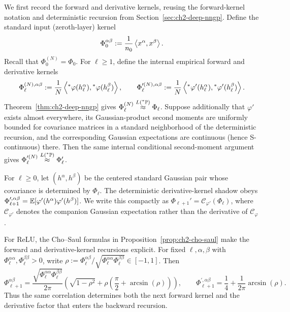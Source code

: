 We first record the forward and derivative kernels, reusing the forward-kernel notation and deterministic recursion from Section~\ref{sec:ch2-deep-nngp}. Define the standard input (zeroth-layer) kernel
\begin{equation}\label{eq:ch2-deep-ntk-phi0}
\Phi_0^{\alpha\beta} := \frac{1}{n_0} \left\langle x^\alpha, x^\beta \right\rangle.
\end{equation}
Recall that $\Phi_0^{(N)} = \Phi_0$. For $\ell \ge 1$, define the internal empirical forward and derivative kernels
\begin{equation}\label{eq:ch2-deep-ntk-emp-kernels}
\Phi_\ell^{(N),\alpha\beta} := \frac{1}{N} \left\langle {}^*\varphi(h_\ell^\alpha), {}^*\varphi(h_\ell^\beta) \right\rangle, \qquad
\Phi_\ell^{\prime(N),\alpha\beta} := \frac{1}{N} \left\langle {}^*\varphi'(h_\ell^\alpha), {}^*\varphi'(h_\ell^\beta) \right\rangle.
\end{equation}
Theorem~\ref{thm:ch2-deep-nngp} gives $\Phi_\ell^{(N)} \stackrel{L({}^*\mathbb{P})}{\approx} \Phi_\ell$. Suppose additionally that $\varphi'$ exists almost everywhere, its Gaussian-product second moments are uniformly bounded for covariance matrices in a standard neighborhood of the deterministic recursion, and the corresponding Gaussian expectations are continuous (hence S-continuous) there. Then the same internal conditional second-moment argument gives $\Phi_\ell^{\prime(N)} \stackrel{L({}^*\mathbb{P})}{\approx} \Phi_\ell'$.

For $\ell \ge 0$, let $(h^\alpha, h^\beta)$ be the centered standard Gaussian pair whose covariance is determined by $\Phi_\ell$. The deterministic derivative-kernel shadow obeys $\Phi_{\ell+1}^{\prime,\alpha\beta} = \mathbb{E}[\varphi'(h^\alpha)\varphi'(h^\beta)]$. We write this compactly as $\Phi_{\ell+1}' = \mathcal{C}_{\varphi'}(\Phi_\ell)$, where $\mathcal{C}_{\varphi'}$ denotes the companion Gaussian expectation rather than the derivative of $\mathcal{C}_\varphi$.

For ReLU, the Cho--Saul formulas in Proposition~\ref{prop:ch2-cho-saul} make the forward and derivative-kernel recursions explicit. For fixed $\ell, \alpha, \beta$ with $\Phi_\ell^{\alpha\alpha}, \Phi_\ell^{\beta\beta} > 0$, write $\rho := \Phi_\ell^{\alpha\beta} / \sqrt{\Phi_\ell^{\alpha\alpha}\Phi_\ell^{\beta\beta}} \in [-1, 1]$. Then
\begin{equation}\label{eq:ch2-relu-rec}
\Phi_{\ell+1}^{\alpha\beta} = \frac{\sqrt{\Phi_\ell^{\alpha\alpha}\Phi_\ell^{\beta\beta}}}{2\pi}\left( \sqrt{1 - \rho^2} + \rho\left(\frac{\pi}{2} + \arcsin(\rho)\right) \right), \qquad
\Phi_{\ell+1}^{\prime,\alpha\beta} = \frac{1}{4} + \frac{1}{2\pi}\arcsin(\rho).
\end{equation}
Thus the same correlation determines both the next forward kernel and the derivative factor that enters the backward recursion.

